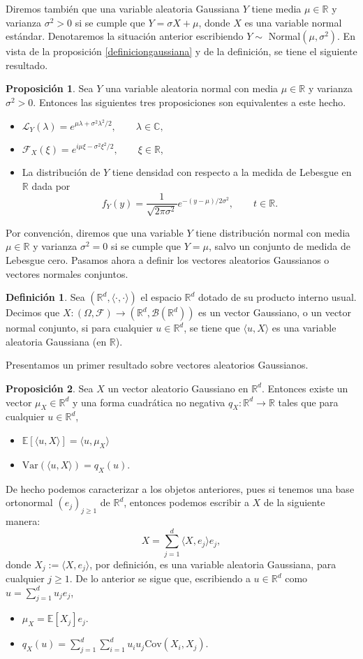 \documentclass[letterpaper,twoside,12pt]{book}
\newcommand{\R}{\mathbb{R}}
\newcommand{\C}{\mathbb{C}}
\newcommand{\F}{\mathcal{F}}
\newcommand{\B}{\mathcal{B}}
\newcommand{\E}{\mathbb{E}}
\newcommand{\1}{\mathds{1}}
\renewcommand{\to}{\rightarrow}
\theoremstyle{definition}
\newtheorem{dfn}{Definición}
\theoremstyle{definition}
\theoremstyle{remark}
\theoremstyle{definition}
\theoremstyle{definition}
\newtheorem{prop}{Proposición}
\theoremstyle{definition}
\theoremstyle{definition}
\theoremstyle{definition}
\begin{document}
Diremos también que una variable aleatoria Gaussiana $Y$ tiene media $\mu\in \R$ y varianza $\sigma^2>0$ si se cumple que $Y=\sigma X+\mu$, donde $X$ es una variable normal estándar. Denotaremos la situación anterior escribiendo $Y\sim$ Normal$(\mu,\sigma^2)$. En vista de la proposición \ref{definiciongaussiana} y de la definición, se tiene el siguiente resultado.
\begin{prop} 
 Sea $Y$ una variable aleatoria normal con media $\mu\in \R$ y varianza $\sigma^2>0$. Entonces las siguientes tres proposiciones son equivalentes a este hecho.
 \begin{itemize}
    \item $\mathcal{L}_Y(\lambda)=e^{\mu\lambda+\sigma^2\lambda^2/2}, \qquad \lambda \in \C,$
    \item $\F_X(\xi)=e^{i\mu\xi-\sigma^2\xi^2/2}, \qquad \xi \in \R$,
    \item La distribución de $Y$ tiene densidad con respecto a la medida de Lebesgue en $\R$ dada por 
    \[
        f_Y(y)=\frac{1}{\sqrt{2\pi\sigma^2}}e^{-(y-\mu)/2\sigma^2}, \qquad t\in \R.    
    \]
 \end{itemize}
 \end{prop}
 Por convención, diremos que una variable $Y$ tiene distribución normal con media $\mu\in \R$ y varianza $\sigma^2=0$ si se cumple que $Y=\mu$, salvo un conjunto de medida de Lebesgue cero. Pasamos ahora a definir los vectores aleatorios Gaussianos o vectores normales conjuntos. 
 \begin{dfn} 
  Sea $(\R^d, \langle\cdot,\cdot\rangle)$ el espacio $\R^{d}$ dotado de su producto interno usual. Decimos que $X:(\Omega,\F)\to (\R^{d},\B(\R^d))$ es un vector Gaussiano, o un vector normal conjunto, si para cualquier $u\in \R^d$, se tiene que $\langle u,X\rangle$ es una variable aleatoria Gaussiana (en $\R$).
  \end{dfn}
Presentamos un primer resultado sobre vectores aleatorios Gaussianos.
\begin{prop} 
Sea $X$ un vector aleatorio Gaussiano en $\R^{d}$. Entonces existe un vector $\mu_X\in\R^d$ y una forma cuadrática no negativa $q_X:\R^d\to \R$ tales que para cualquier $u\in \R^d$,
\begin{itemize}
    \item $\E\left[\langle u,X\rangle\right]=\langle u,\mu_X\rangle$
    \item $\text{Var}\left(\langle u,X\rangle\right)=q_X(u)$.
\end{itemize}
De hecho podemos caracterizar a los objetos anteriores, pues si tenemos una base ortonormal $(e_{j})_{j\geq1}$ de $\R^{d}$, entonces podemos escribir a $X$ de la siguiente manera:
\[
X=\sum_{j=1}^{d}\langle X,e_j\rangle e_j,  
\]
donde $X_j:=\langle X,e_j\rangle$, por definición, es una variable aleatoria Gaussiana, para cualquier $j\geq1$. De lo anterior se sigue que, escribiendo a $u\in \R^d$ como $u=\sum_{j=1}^{d}u_je_j$, 
\begin{itemize}
    \item $\mu_X=\E\left[X_j\right]e_j$.
    \item $q_X(u)=\sum_{j=1}^{d}\sum_{i=1}^{d}u_iu_j \text{Cov}\left(X_i,X_j\right)$.
\end{itemize}
 \end{prop}
\end{document}
